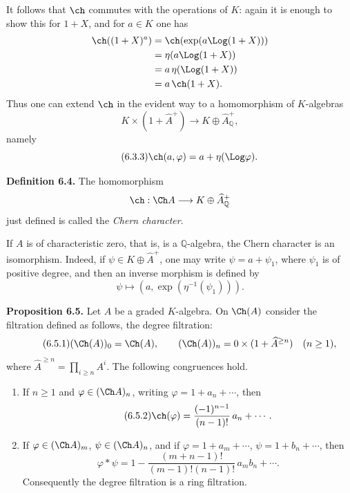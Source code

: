 It follows that \(\ch\) commutes with the operations of \(K\): again it is enough to show this for \(1+X\), and for \(a\in K\) one has
\[
\begin{aligned}
 \ch((1+X)^a)
 &=\ch(\exp(a\Log(1+X)))\\
 &=\eta(a\Log(1+X))\\
 &=a\,\eta(\Log(1+X))\\
 &=a\,\ch(1+X).
\end{aligned}
\]
Thus one can extend \(\ch\) in the evident way to a homomorphism of \(K\)-algebras
\[
  K\times(1+\widehat A^+)\longrightarrow K\oplus\widehat A_{\mathbb Q}^{+},
\]
namely
\begin{equation}\tag{6.3.3}
  \ch(a,\varphi)=a+\eta(\Log\varphi).
\end{equation}

\textbf{Definition 6.4.} The homomorphism
\[
  \ch:\Ch A\longrightarrow K\oplus\widehat A_{\mathbb Q}^{+}
\]
just defined is called the \emph{Chern character}.

If \(A\) is of characteristic zero, that is, is a \(\mathbb Q\)-algebra, the Chern character is an isomorphism. Indeed, if \(\psi\in K\oplus\widehat A^+\), one may write \(\psi=a+\psi_1\), where \(\psi_1\) is of positive degree, and then an inverse morphism is defined by
\[
  \psi\longmapsto (a,\exp(\eta^{-1}(\psi_1))).
\]

\textbf{Proposition 6.5.} Let \(A\) be a graded \(K\)-algebra. On \(\Ch(A)\) consider the filtration defined as follows, the degree filtration:
\begin{equation}\tag{6.5.1}
  (\Ch(A))_0=\Ch(A),\qquad
  (\Ch(A))_n=0\times(1+\widehat A^{\ge n})\quad(n\ge1),
\end{equation}
where \(\widehat A^{\ge n}=\prod_{i\ge n}A^i\). The following congruences hold.

\begin{enumerate}[label=\roman*)]
\item If \(n\ge1\) and \(\varphi\in(\Ch A)_n\), writing \(\varphi=1+a_n+\cdots\), then
\begin{equation}\tag{6.5.2}
  \ch(\varphi)=\frac{(-1)^{n-1}}{(n-1)!}\,a_n+\cdots .
\end{equation}

\item If \(\varphi\in(\Ch A)_m\), \(\psi\in(\Ch A)_n\), and if
\(\varphi=1+a_m+\cdots\), \(\psi=1+b_n+\cdots\), then
\begin{equation}\tag{6.5.3}
  \varphi*\psi
  =
  1-\frac{(m+n-1)!}{(m-1)!(n-1)!}\,a_m b_n+\cdots .
\end{equation}
Consequently the degree filtration is a ring filtration.
\end{enumerate}

